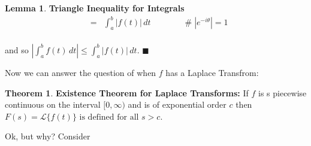 \documentclass{article}
\theoremstyle{definition}
\newtheorem{theorem}{Theorem}[section]
\newtheorem{lemma}{Lemma}[section]
\begin{document}
\begin{lemma} {\bf Triangle Inequality for Integrals}
\begin{equation*}
\begin{array}{llll}
&=& {\displaystyle \int_{a}^{b} \left | f(t) \right | \, dt}
	&\hspace{3em} \mathrel{\#} |e^{-i\theta}| = 1 \\
\end{array}
\end{equation*}

\bigskip
\noindent
and so ${\displaystyle \left | \int_{a}^{b} f(t) \,  dt \right | \leq \int_{a}^{b} \left | f(t) 
\right | \, dt}$. $\blacksquare$




\end{lemma}

\bigskip
\bigskip
\noindent
Now we can answer the question of when $f$ has a Laplace
Transfrom: 

\bigskip
\begin{theorem} 
{\bf Existence Theorem for Laplace Transforms:} \normalfont If
$f$ is s piecewise continuous on the interval $[0,\infty)$ and is
of exponential order $c$ then $F (s) = \mathcal{L}\{f (t)\}
\text{ is defined for all $s > c$}.$
\end{theorem}

\bigskip
\noindent
Ok, but why? Consider
\end{document}
